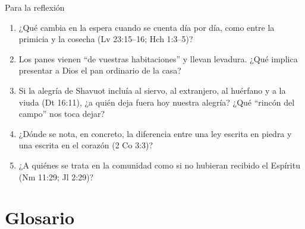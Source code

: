 \begin{frame}{Para la reflexión}
\small
\begin{enumerate}
\item ¿Qué cambia en la espera cuando se cuenta día por día, como entre la primicia y la cosecha (Lv 23:15--16; Hch 1:3--5)?
\item Los panes vienen ``de vuestras habitaciones'' y llevan levadura. ¿Qué implica presentar a Dios el pan ordinario de la casa?
\item Si la alegría de Shavuot incluía al siervo, al extranjero, al huérfano y a la viuda (Dt 16:11), ¿a quién deja fuera hoy nuestra alegría? ¿Qué ``rincón del campo'' nos toca dejar?
\item ¿Dónde se nota, en concreto, la diferencia entre una ley escrita en piedra y una escrita en el corazón (2 Co 3:3)?
\item ¿A quiénes se trata en la comunidad como si no hubieran recibido el Espíritu (Nm 11:29; Jl 2:29)?
\end{enumerate}
\end{frame}

\section{Glosario}

